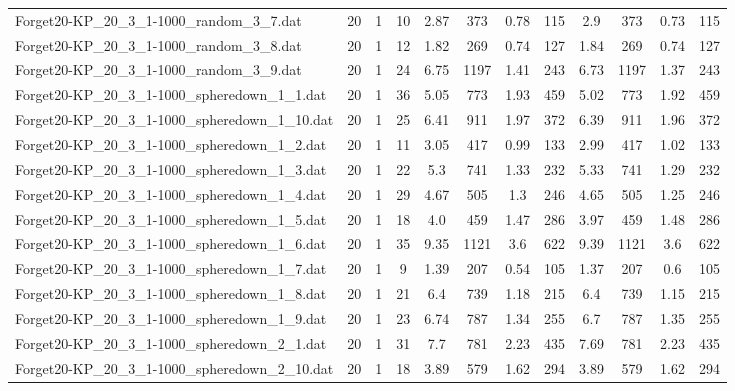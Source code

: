 \begin{sidewaystable}[!ht]
{\begin{tabular}{lccccccccccc}
Forget20-KP\_20\_3\_1-1000\_random\_3\_7.dat & 20 & 1 & 10 & 2.87 & 373 & 0.78 & 115 & 2.9 & 373 &  \textcolor{blue2}{0.73} & 115 \\
Forget20-KP\_20\_3\_1-1000\_random\_3\_8.dat & 20 & 1 & 12 & 1.82 & 269 &  \textcolor{blue2}{0.74} & 127 & 1.84 & 269 &  \textcolor{blue2}{0.74} & 127 \\
Forget20-KP\_20\_3\_1-1000\_random\_3\_9.dat & 20 & 1 & 24 & 6.75 & 1197 & 1.41 & 243 & 6.73 & 1197 &  \textcolor{blue2}{1.37} & 243 \\
Forget20-KP\_20\_3\_1-1000\_spheredown\_1\_1.dat & 20 & 1 & 36 & 5.05 & 773 & 1.93 & 459 & 5.02 & 773 &  \textcolor{blue2}{1.92} & 459 \\
Forget20-KP\_20\_3\_1-1000\_spheredown\_1\_10.dat & 20 & 1 & 25 & 6.41 & 911 & 1.97 & 372 & 6.39 & 911 & 1.96 & 372 \\
Forget20-KP\_20\_3\_1-1000\_spheredown\_1\_2.dat & 20 & 1 & 11 & 3.05 & 417 &  \textcolor{blue2}{0.99} & 133 & 2.99 & 417 & 1.02 & 133 \\
Forget20-KP\_20\_3\_1-1000\_spheredown\_1\_3.dat & 20 & 1 & 22 & 5.3 & 741 & 1.33 & 232 & 5.33 & 741 & 1.29 & 232 \\
Forget20-KP\_20\_3\_1-1000\_spheredown\_1\_4.dat & 20 & 1 & 29 & 4.67 & 505 & 1.3 & 246 & 4.65 & 505 &  \textcolor{blue2}{1.25} & 246 \\
Forget20-KP\_20\_3\_1-1000\_spheredown\_1\_5.dat & 20 & 1 & 18 & 4.0 & 459 & 1.47 & 286 & 3.97 & 459 & 1.48 & 286 \\
Forget20-KP\_20\_3\_1-1000\_spheredown\_1\_6.dat & 20 & 1 & 35 & 9.35 & 1121 &  \textcolor{blue2}{3.6} & 622 & 9.39 & 1121 &  \textcolor{blue2}{3.6} & 622 \\
Forget20-KP\_20\_3\_1-1000\_spheredown\_1\_7.dat & 20 & 1 & 9 & 1.39 & 207 &  \textcolor{blue2}{0.54} & 105 & 1.37 & 207 & 0.6 & 105 \\
Forget20-KP\_20\_3\_1-1000\_spheredown\_1\_8.dat & 20 & 1 & 21 & 6.4 & 739 & 1.18 & 215 & 6.4 & 739 &  \textcolor{blue2}{1.15} & 215 \\
Forget20-KP\_20\_3\_1-1000\_spheredown\_1\_9.dat & 20 & 1 & 23 & 6.74 & 787 & 1.34 & 255 & 6.7 & 787 & 1.35 & 255 \\
Forget20-KP\_20\_3\_1-1000\_spheredown\_2\_1.dat & 20 & 1 & 31 & 7.7 & 781 &  \textcolor{blue2}{2.23} & 435 & 7.69 & 781 &  \textcolor{blue2}{2.23} & 435 \\
Forget20-KP\_20\_3\_1-1000\_spheredown\_2\_10.dat & 20 & 1 & 18 & 3.89 & 579 &  \textcolor{blue2}{1.62} & 294 & 3.89 & 579 &  \textcolor{blue2}{1.62} & 294 \\

\end{tabular}}
\end{sidewaystable}
